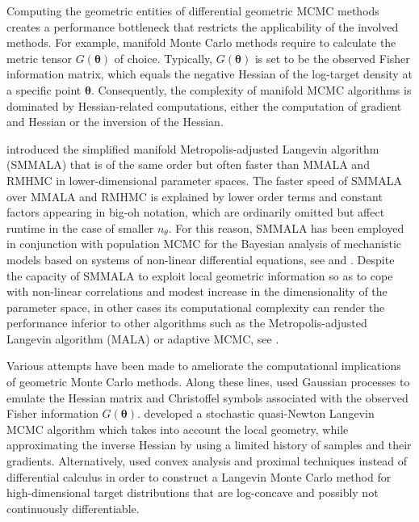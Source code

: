 \documentclass[twoside,11pt]{article}
\begin{document}
Computing the geometric entities of differential geometric MCMC methods creates a performance bottleneck that restricts the 
applicability of the involved methods. For example, manifold Monte Carlo methods require to calculate the metric tensor
$G(\boldsymbol{\theta})$ of choice. Typically, $G(\boldsymbol{\theta})$ is set to be the observed Fisher information matrix,
which equals the negative Hessian of the log-target density at a specific point $\boldsymbol{\theta}$. Consequently, the 
complexity of manifold MCMC algorithms is dominated by Hessian-related computations, either the computation of gradient and 
Hessian or the inversion of the Hessian.  

\cite{gir_cal__rie} introduced the simplified manifold Metropolis-adjusted Langevin algorithm (SMMALA) that is of the same 
order but often faster than MMALA and RMHMC in lower-dimensional parameter spaces. The faster speed of SMMALA over MMALA and 
RMHMC is explained by lower order terms and constant factors appearing in big-oh notation, which are ordinarily omitted but 
affect runtime in the case of smaller $n_\theta$. For this reason, SMMALA has been employed in conjunction with population 
MCMC for the Bayesian analysis of mechanistic models based on systems of non-linear differential equations, see 
\cite{cal_gir__sta} and \cite{sch_pap__ews}. Despite the capacity of SMMALA to exploit local geometric information so as to 
cope with non-linear correlations and modest increase in the dimensionality of the parameter space, in other cases its 
computational complexity can render the performance inferior to other algorithms such as the Metropolis-adjusted Langevin 
algorithm (MALA) or adaptive MCMC, see \cite{cal_eps_sil__bay}.

Various attempts have been made to ameliorate the computational implications of geometric Monte Carlo methods. Along these 
lines, \cite{lan_tha_chr__emu} used Gaussian processes to emulate the Hessian matrix and Christoffel symbols associated with 
the observed Fisher information $G(\boldsymbol{\theta})$. \cite{sim_bad_cem__sto} developed a stochastic quasi-Newton 
Langevin MCMC algorithm which takes into account the local geometry, while approximating the inverse Hessian by using a 
limited history of samples and their gradients. Alternatively, \cite{per__prox} used convex analysis and proximal techniques 
instead of differential calculus in order to construct a Langevin Monte Carlo method for high-dimensional target 
distributions that are log-concave and possibly not continuously differentiable.
\end{document}
